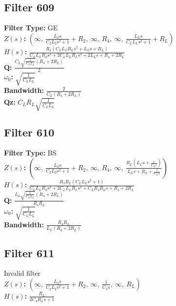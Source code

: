 \documentclass{article}
\begin{document}
\subsection*{Filter 609}
\textbf{Filter Type:} GE \\ 
\textbf{$Z(s)$:} $\left( \infty, \  \frac{L_{2} s}{C_{2} L_{2} s^{2} + 1} + R_{2}, \  \infty, \  R_{4}, \  \infty, \  \frac{L_{L} s}{C_{L} L_{L} s^{2} + 1} + R_{L}\right)$ \\ 
\textbf{$H(s)$:} $\frac{R_{4} \left(C_{L} L_{L} R_{L} s^{2} + L_{L} s + R_{L}\right)}{C_{L} L_{L} R_{4} s^{2} + 2 C_{L} L_{L} R_{L} s^{2} + 2 L_{L} s + R_{4} + 2 R_{L}}$ \\ 
\textbf{Q:} $\frac{C_{L} \sqrt{\frac{1}{C_{L} L_{L}}} \left(R_{4} + 2 R_{L}\right)}{2}$ \\ 
\textbf{$\omega_0$:} $\sqrt{\frac{1}{C_{L} L_{L}}}$ \\ 
\textbf{Bandwidth:} $\frac{2}{C_{L} \left(R_{4} + 2 R_{L}\right)}$ \\ 
\textbf{Qz:} $C_{L} R_{L} \sqrt{\frac{1}{C_{L} L_{L}}}$ \\ 
\subsection*{Filter 610}
\textbf{Filter Type:} BS \\ 
\textbf{$Z(s)$:} $\left( \infty, \  \frac{L_{2} s}{C_{2} L_{2} s^{2} + 1} + R_{2}, \  \infty, \  R_{4}, \  \infty, \  \frac{R_{L} \left(L_{L} s + \frac{1}{C_{L} s}\right)}{L_{L} s + R_{L} + \frac{1}{C_{L} s}}\right)$ \\ 
\textbf{$H(s)$:} $\frac{R_{4} R_{L} \left(C_{L} L_{L} s^{2} + 1\right)}{C_{L} L_{L} R_{4} s^{2} + 2 C_{L} L_{L} R_{L} s^{2} + C_{L} R_{4} R_{L} s + R_{4} + 2 R_{L}}$ \\ 
\textbf{Q:} $\frac{L_{L} \sqrt{\frac{1}{C_{L} L_{L}}} \left(R_{4} + 2 R_{L}\right)}{R_{4} R_{L}}$ \\ 
\textbf{$\omega_0$:} $\sqrt{\frac{1}{C_{L} L_{L}}}$ \\ 
\textbf{Bandwidth:} $\frac{R_{4} R_{L}}{L_{L} \left(R_{4} + 2 R_{L}\right)}$ \\ 
\subsection*{Filter 611}
Invalid filter \\ 
\textbf{$Z(s)$:} $\left( \infty, \  \frac{L_{2} s}{C_{2} L_{2} s^{2} + 1} + R_{2}, \  \infty, \  \frac{1}{C_{4} s}, \  \infty, \  R_{L}\right)$ \\ 
\textbf{$H(s)$:} $\frac{R_{L}}{2 C_{4} R_{L} s + 1}$ \\ 
\end{document}

